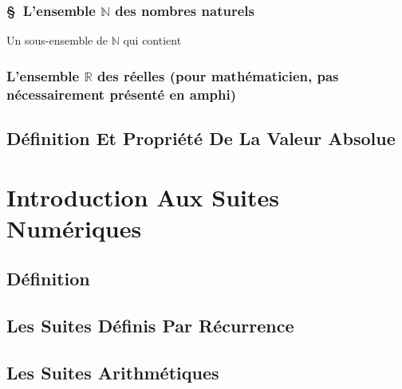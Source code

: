 \documentclass[11pt]{report}
\begin{document}
\subsection{\S \ L'ensemble $\mathbb{N}$ des nombres naturels}
\lipsum[1]
\item Un sous-ensemble de $\mathbb{N}$ qui contient %
\subsection{ L'ensemble $\mathbb{R}$ des réelles (pour mathématicien, pas nécessairement présenté en amphi) }
\lipsum[1]
\section{Définition Et Propriété De La Valeur Absolue}
\lipsum[1]
\chapter{Introduction Aux Suites Numériques}
\section{Définition}
\lipsum[1]
\section{Les Suites Définis Par Récurrence}
\lipsum[1]
\section{Les Suites Arithmétiques}
\lipsum[1]
\end{document}

